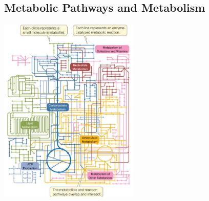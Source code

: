\documentclass[10pt]{article}
\begin{document}
\subsection*{Metabolic Pathways and Metabolism}
\begin{center}
    \includegraphics*[width=0.5\textwidth]{L1_1.png}
\end{center}
\end{document}
